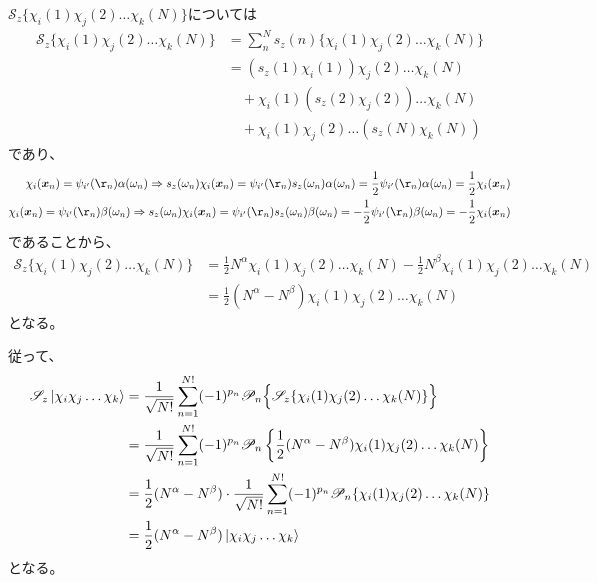 $\mathscr{S}_z\{\chi_i(1) \chi_j(2) \dots \chi_k(N)\}$については
\begin{align}
	\mathscr{S}_z\{
		\chi_i(1) \chi_j(2) \dots \chi_k(N)
	\}
&=
	\sum_n^N
		s_z(n)\{
			\chi_i(1) \chi_j(2) \dots \chi_k(N)
		\} \\
%
%
&=
	(s_z(1) \chi_i(1)) \chi_j(2) \dots \chi_k(N) \nonumber \\ &\quad
	+
	\chi_i(1) (s_z(2) \chi_j(2)) \dots \chi_k(N) \nonumber \\ &\quad
	+
	\chi_i(1) \chi_j(2) \dots (s_z(N) \chi_k(N))
\end{align}
であり、
\begin{align}
	\chi_i(\x_n)
=
	\psi_{i'}(\r_n) \alpha(\omega_n)
\Rightarrow
	s_z(\omega_n) \chi_i(\x_n)
=
	\psi_{i'}(\r_n) s_z(\omega_n) \alpha(\omega_n)
=
	\frac{1}{2} \psi_{i'}(\r_n) \alpha(\omega_n)
=
	\frac{1}{2} \chi_i(\x_n) \\
%
%
	\chi_i(\x_n)
=
	\psi_{i'}(\r_n) \beta(\omega_n)
\Rightarrow
	s_z(\omega_n) \chi_i(\x_n)
=
	\psi_{i'}(\r_n) s_z(\omega_n) \beta(\omega_n)
=
	-
	\frac{1}{2} \psi_{i'}(\r_n) \beta(\omega_n)
=
	-
	\frac{1}{2} \chi_i(\x_n)
\end{align}
であることから、
\begin{align}
	\mathscr{S}_z\{
		\chi_i(1) \chi_j(2) \dots \chi_k(N)
	\}
&=
	\frac{1}{2} N^{\alpha}
	\chi_i(1) \chi_j(2) \dots \chi_k(N)
	-
	\frac{1}{2} N^{\beta}
	\chi_i(1) \chi_j(2) \dots \chi_k(N) \\
%
%
&=
	\frac{1}{2}
	(N^{\alpha} -N^{\beta})
	\chi_i(1) \chi_j(2) \dots \chi_k(N)
\end{align}
となる。

従って、
\begin{align}
	\mathscr{S}_z\ket{\chi_i\chi_j\dots\chi_k}
&=
	\frac{1}{\sqrt{N!}}
	\sum_{n=1}^{N!}
		(-1)^{p_n}
		\mathscr{P}_n\Bigl\{
			\mathscr{S}_z\{
				\chi_i(1) \chi_j(2) \dots \chi_k(N)
			\}
		\Bigr\} \\
%
%
&=
	\frac{1}{\sqrt{N!}}
	\sum_{n=1}^{N!}
		(-1)^{p_n}
		\mathscr{P}_n\left\{
			\frac{1}{2}
			(N^{\alpha} -N^{\beta})
			\chi_i(1) \chi_j(2) \dots \chi_k(N)
		\right\} \\
%
%
&=
	\frac{1}{2}
	(N^{\alpha} -N^{\beta}) \cdot
	\frac{1}{\sqrt{N!}}
	\sum_{n=1}^{N!}
		(-1)^{p_n}
		\mathscr{P}_n\{
			\chi_i(1) \chi_j(2) \dots \chi_k(N)
		\} \\
%
%
&=
	\frac{1}{2}
	(N^{\alpha} -N^{\beta})
	\ket{\chi_i\chi_j\dots\chi_k}
\end{align}
となる。


